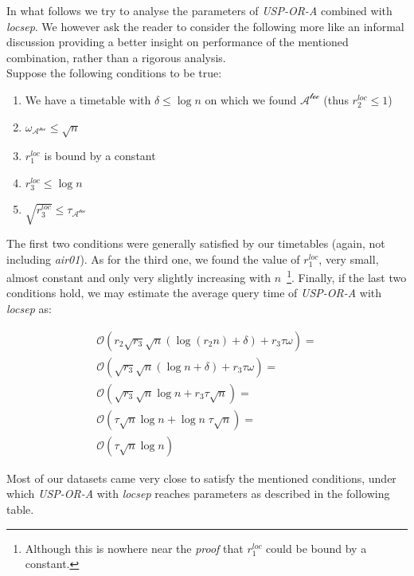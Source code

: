 		\noindent In what follows we try to analyse the parameters of \textit{USP-OR-A} combined with \textit{locsep}. We however ask the reader to consider the following more like an informal discussion providing a better insight on performance of the mentioned combination, rather than a rigorous analysis. \\
		
		\noindent Suppose the following conditions to be true:
		\begin{enumerate}
			\item We have a timetable with $\delta \leq \log n$ on which we found $\mathcal{A^{loc}}$ (thus $r_{2}^{loc} \leq 1$)
			\item $\omega_{\mathcal{A^{loc}}} \leq \sqrt{n}$
			\item $r_{1}^{loc}$ is bound by a constant
			\item $r_{3}^{loc} \leq \log n$
			\item $\sqrt{r_{3}^{loc}} \leq \tau_{\mathcal{A^{loc}}}$
		\end{enumerate}
		\hspace{\fill}
		
		\noindent The first two conditions were generally satisfied by our timetables (again, not including \textit{air01}). As for the third one, we found the value of $r_{1}^{loc}$, very small, almost constant and only very slightly increasing with $n$~\footnote{Although this is nowhere near the \textit{proof} that $r_{1}^{loc}$ could be bound by a constant.}. Finally, if the last two conditions hold, we may estimate the average query time of \textit{USP-OR-A} with \textit{locsep} as:
		
		\begin{align*}
			\mathcal{O}(r_{2} \sqrt{r_{3}} \sqrt{n} (\log (r_{2}n) + \delta) + r_{3} \tau \omega) = \\
			\mathcal{O}(\sqrt{r_{3}} \sqrt{n} (\log n + \delta) + r_{3} \tau \omega) = \\
			\mathcal{O}(\sqrt{r_{3}} \sqrt{n} \log n + r_{3} \tau \sqrt{n}) = \\
			\mathcal{O}(\tau \sqrt{n} \log n + \log n \; \tau \sqrt{n}) = \\
			\mathcal{O}(\tau \sqrt{n} \log n)
		\end{align*}
		
		\noindent Most of our datasets came very close to satisfy the mentioned conditions, under which \textit{USP-OR-A} with \textit{locsep} reaches parameters as described in the following table.
		
